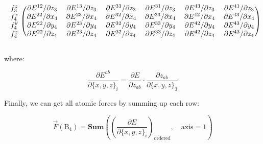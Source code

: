 \documentclass{article}
\begin{document}
\begin{eqnarray}
\begin{blockarray}{ccccccc}
\begin{block}{c(cccccc)}
f^z_3 &
\partial{E^{12}} / \partial{z_3} & \partial{E^{13}} / \partial{z_3} &
\partial{E^{33}} / \partial{z_3} & \partial{E^{31}} / \partial{z_3} &
\partial{E^{43}} / \partial{z_3} & \partial{E^{41}} / \partial{z_3} \\
%
f^x_4 &
\partial{E^{22}} / \partial{x_4} & \partial{E^{23}} / \partial{x_4} &
\partial{E^{32}} / \partial{x_4} & \partial{E^{33}} / \partial{x_4} &
\partial{E^{42}} / \partial{x_4} & \partial{E^{43}} / \partial{x_4} \\
f^y_4 &
\partial{E^{22}} / \partial{y_4} & \partial{E^{23}} / \partial{y_4} &
\partial{E^{32}} / \partial{y_4} & \partial{E^{33}} / \partial{y_4} &
\partial{E^{42}} / \partial{y_4} & \partial{E^{43}} / \partial{y_4} \\
f^z_4 &
\partial{E^{22}} / \partial{z_4} & \partial{E^{23}} / \partial{z_4} &
\partial{E^{32}} / \partial{z_4} & \partial{E^{33}} / \partial{z_4} &
\partial{E^{42}} / \partial{z_4} & \partial{E^{43}} / \partial{z_4} \\
\end{block}
\end{blockarray}
\end{eqnarray}

\noindent where:

\begin{equation}
\frac{\partial{E^{ab}}}{\partial{\{x, y, z\}_i}} = 
\frac{\partial{E}}{\partial{z_{ab}}}
\cdot
\frac{\partial{z_{ab}}}{\partial{\{x, y, z\}_3}}
\end{equation}

\noindent Finally, we can get all atomic forces by summing up each row:

\begin{equation}
\vec{F}(\mathrm{B}_{4}) = 
\mathbf{Sum}\left(
\left(
	\frac{\partial{E}}{\partial{\{x, y, z\}_i}}
\right)_{\mathrm{ordered}}, \quad \mathrm{axis} = 1
\right)
\end{equation}
\end{document}
